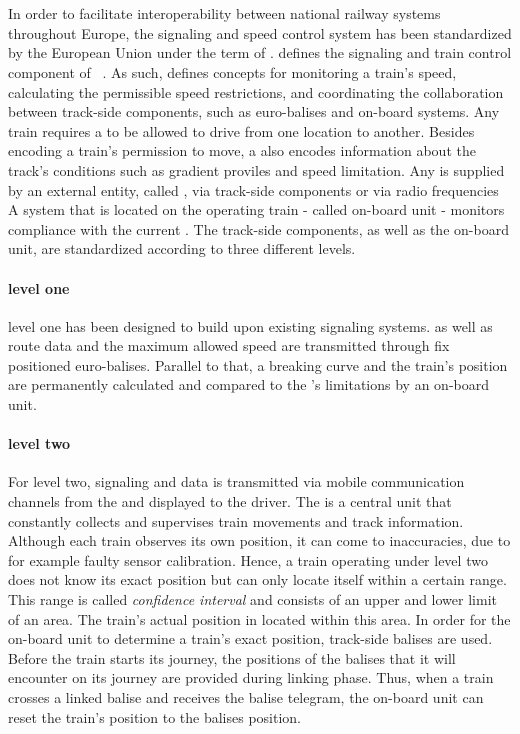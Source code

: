 \section{}
In order to facilitate interoperability between national railway systems throughout Europe, the signaling and speed control system has been standardized by the European Union under the term of .
 defines the signaling and train control component of ~\cite{ETCS26}.
As such,  defines concepts for monitoring a train's speed, calculating the permissible speed restrictions, and coordinating the collaboration between track-side components, such as  euro-balises and on-board systems.
Any train requires a  to be allowed to drive from one location to another.
Besides encoding a train's permission to move, a  also encodes information about the track's conditions such as gradient proviles and speed limitation.
Any  is supplied by an external entity, called , via track-side components or via radio frequencies
A system that is located on the operating train - called on-board unit - monitors compliance with the current .
The track-side components, as well as the on-board unit, are standardized according to three different  levels.

\paragraph{ level one}
 level one has been designed to build upon existing signaling systems.
 as well as route data and the maximum allowed speed are transmitted through fix positioned euro-balises.
Parallel to that, a breaking curve and the train's position are permanently calculated and compared to the 's limitations by an on-board unit.

\paragraph{ level two}
For  level two, signaling and  data is transmitted via mobile communication channels from the  and displayed to the driver.
The  is a central unit that constantly collects and supervises train movements and track information.
Although each train observes its own position, it can come to inaccuracies, due to for example faulty sensor calibration.
Hence, a train operating under  level two does not know its exact position but can only locate itself within a certain range.
This range is called \textit{confidence interval} and consists of an upper and lower limit of an area.
The train's actual position in located within this area.
In order for the on-board unit to determine a train's exact position, track-side balises are used.
Before the train starts its journey, the positions of the balises that it will encounter on its journey are provided during linking phase.
Thus, when a train crosses a linked balise and receives the balise telegram, the on-board unit can reset the train's position to the balises position.

